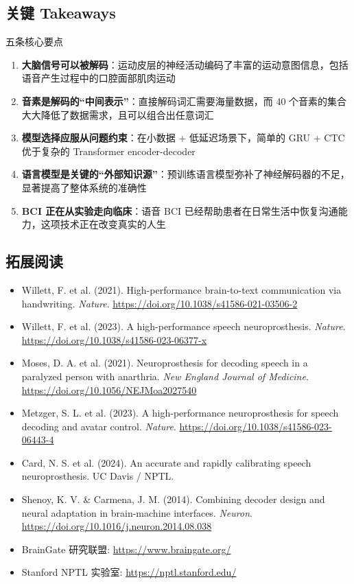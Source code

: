 \subsection{关键 Takeaways}

\begin{importantbox}{五条核心要点}
\begin{enumerate}
    \item \textbf{大脑信号可以被解码}：运动皮层的神经活动编码了丰富的运动意图信息，包括语音产生过程中的口腔面部肌肉运动
    \item \textbf{音素是解码的``中间表示''}：直接解码词汇需要海量数据，而 40 个音素的集合大大降低了数据需求，且可以组合出任意词汇
    \item \textbf{模型选择应服从问题约束}：在小数据 + 低延迟场景下，简单的 GRU + CTC 优于复杂的 Transformer encoder-decoder
    \item \textbf{语言模型是关键的``外部知识源''}：预训练语言模型弥补了神经解码器的不足，显著提高了整体系统的准确性
    \item \textbf{BCI 正在从实验走向临床}：语音 BCI 已经帮助患者在日常生活中恢复沟通能力，这项技术正在改变真实的人生
\end{enumerate}
\end{importantbox}

\subsection{拓展阅读}

\begin{itemize}
    \item Willett, F. et al. (2021). High-performance brain-to-text communication via handwriting. \textit{Nature}. \url{https://doi.org/10.1038/s41586-021-03506-2}
    \item Willett, F. et al. (2023). A high-performance speech neuroprosthesis. \textit{Nature}. \url{https://doi.org/10.1038/s41586-023-06377-x}
    \item Moses, D. A. et al. (2021). Neuroprosthesis for decoding speech in a paralyzed person with anarthria. \textit{New England Journal of Medicine}. \url{https://doi.org/10.1056/NEJMoa2027540}
    \item Metzger, S. L. et al. (2023). A high-performance neuroprosthesis for speech decoding and avatar control. \textit{Nature}. \url{https://doi.org/10.1038/s41586-023-06443-4}
    \item Card, N. S. et al. (2024). An accurate and rapidly calibrating speech neuroprosthesis. UC Davis / NPTL.
    \item Shenoy, K. V. \& Carmena, J. M. (2014). Combining decoder design and neural adaptation in brain-machine interfaces. \textit{Neuron}. \url{https://doi.org/10.1016/j.neuron.2014.08.038}
    \item BrainGate 研究联盟: \url{https://www.braingate.org/}
    \item Stanford NPTL 实验室: \url{https://nptl.stanford.edu/}
\end{itemize}


